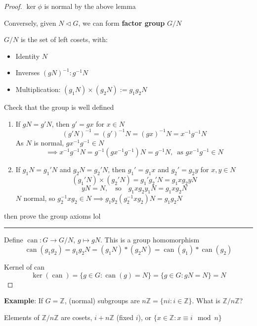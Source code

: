 \documentclass{article}
\DeclareMathOperator{\can}{can}
\begin{document}
\begin{proof}
    $\ker \phi$ is normal by the above lemma
    
    Conversely, given $N \triangleleft G$, we can form \textbf{factor group} $G /N$

    $G /N$ is the set of left cosets, with:
    \begin{itemize}
        \item Identity $N$
        \item Inverses $(gN)^{-1} : g^{-1}N$
        \item Multiplication: $(g_{1}N) \times (g_{2}N) := g_{1}g_{2}N$
    \end{itemize}

    Check that the group is well defined
    \begin{enumerate}
        \item If $gN = g'N$, then $g' = gx$ for $x\in N$
            \[(g'N)^{-1} = (g')^{-1}N = (gx)^{-1}N = x^{-1}g^{-1}N\]
            As $N$ is normal, $gx^{-1}g^{-1}\in N$
            \[\implies x^{-1}g^{-1}N = g^{-1}(gx^{-1}g^{-1})N = g^{-1}N,\,\text{ as } gx^{-1}g^{-1}\in N\]
        \item If $g_{1}N = g_{1}'N$ and $g_{2}N = g_{2}'N$, then $g_{1}' = g_{1}x$ and $g_{2}' = g_{2}y$ for $x, y\in N$
            \[(g_{1}'N) \times (g_{2}'N) = g_{1}'g_{2}'N = g_{1}x g_{2}yN\]
            \[yN = N,\quad\text{so}\quad g_{1}xg_{2}y_{1}N = g_{1}xg_{2}N\]
            $N$ normal, so $g_{2}^{-1} x g_{2}\in N \implies g_{1}g_{2}(g_{2}^{-1}xg_{2})N = g_{1}g_{2}N$
    \end{enumerate}

    then prove the group axioms lol

    \vspace{-3pt}
    \noindent\rule{\textwidth}{0.08ex}

    Define $\can : G \to G / N$, $g \mapsto gN$. This is a group homomorphism
    \[\can(g_{1}g_{2}) = g_{1}g_{2}N = (g_{1}N) * (g_{2}N) = \can(g_{1}) * \can(g_{2})\]

    Kernel of can
    \[\ker(\can) = \{g\in G : \can(g) = N\} = \{g\in G : gN = N\} = N\]
\end{proof}

\textbf{Example}: If $G = \mathbb{Z}$, (normal) subgroups are $n\mathbb{Z} = \{ni : i \in \mathbb{Z}\}$. What is $\mathbb{Z} /n \mathbb{Z}$?

Elements of $\mathbb{Z} / n\mathbb{Z}$ are cosets, $i + n\mathbb{Z}$ (fixed $i$), or $\{x\in \mathbb{Z} : x \equiv i \mod n\}$
\end{document}
